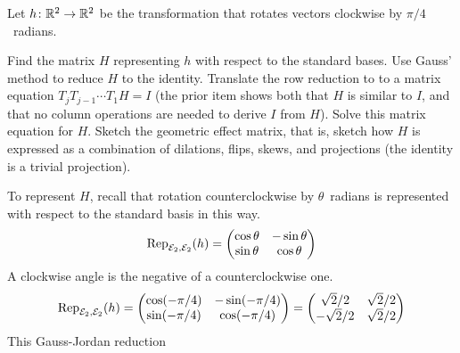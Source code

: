 \begin{exercises}
  \item 
    Let $\map{h}{\Re^2}{\Re^2}$ be the transformation that rotates
    vectors clockwise by $\pi/4$~radians.
    \begin{exparts}
      \partsitem Find the matrix $H$ representing 
         $h$ with respect to the standard bases.
         Use Gauss' method to reduce $H$ to the identity.
      \partsitem Translate the row reduction to to a matrix equation
        $T_jT_{j-1}\cdots T_1H=I$
        (the prior item shows both that $H$ is similar to $I$, and that
        no column operations are needed to derive $I$ from $H$).
      \partsitem Solve this matrix equation for $H$.
      \partsitem Sketch the geometric effect matrix, that is, sketch how
        $H$ is expressed as a 
        combination of dilations, flips, skews, and projections
        (the identity is a trivial projection). 
    \end{exparts}
    \begin{answer}
      \begin{exparts}
        \partsitem  To represent $H$, recall that rotation counterclockwise by 
          $\theta$~radians is represented with respect to the standard basis
          in this way.
          \begin{equation*}
            \rep{h}{\stdbasis_2,\stdbasis_2}
            =\begin{pmatrix}
              \cos\theta  &-\sin\theta  \\
              \sin\theta  &\cos\theta
             \end{pmatrix}
          \end{equation*}
          A clockwise angle is the negative of a counterclockwise
          one.  
          \begin{equation*}
            \rep{h}{\stdbasis_2,\stdbasis_2}
            =\begin{pmatrix}
              \cos(-\pi/4)  &-\sin(-\pi/4)  \\
              \sin(-\pi/4)  &\cos(-\pi/4)
            \end{pmatrix}
            =\begin{pmatrix}
              \sqrt{2}/2  &\sqrt{2}/2  \\
              -\sqrt{2}/2 &\sqrt{2}/2
            \end{pmatrix}
          \end{equation*}
          This Gauss-Jordan reduction
          \begin{equation*}

\end{equation*}
\end{exparts}
\end{answer}
\end{exercises}
